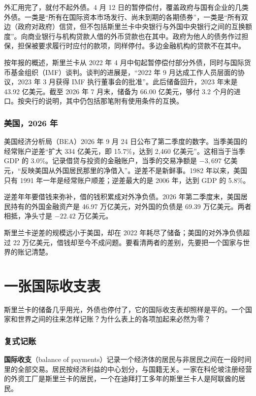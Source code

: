 外汇用完了，就付不起外债。4 月 12 日的暂停偿付，覆盖政府与国有企业的几类外债。一类是“所有在国际资本市场发行、尚未到期的各期债券”，一类是“所有双边（政府对政府）信贷，但不包括斯里兰卡中央银行与外国中央银行之间的互换额度”。向商业银行与机构贷款人借的外币贷款也在其中。政府为他人的债务作过担保，担保被要求履行时应付的款项，同样停付。多边金融机构的贷款不在其中\cite{lktreasury2022}。

按年报的概述，斯里兰卡从 2022 年 4 月中旬起暂停偿付部分外债，同时与国际货币基金组织（IMF）谈判。谈判的进展是，“2022 年 9 月达成工作人员层面的协议，2023 年 3 月获得 IMF 执行董事会的批准”\cite{cbsl2023ar}。此后储备回升，2023 年末是 43.92 亿美元。截至 2026 年 7 月末，储备为 66.00 亿美元，够付 3.2 个月的进口。按央行的说明，其中仍包括那笔附有使用条件的互换\cite{cbsl2026rdt}。

\subsubsection{美国，2026 年}
美国经济分析局（BEA）2026 年 9 月 24 日公布了第二季度的数字。当季美国的经常账户逆差“扩大 334 亿美元，即 15.7\%，达到 2,460 亿美元”。这相当于当季 GDP 的 3.0\%。记录借贷与投资的金融账户，当季的交易净额是 $-3,697$ 亿美元，“反映美国从外国居民那里的净借入”\cite{bea2026q2}。逆差不是新鲜事。1982 年以来，美国只有 1991 年一年是经常账户顺差；逆差最大的是 2006 年，达到 GDP 的 5.8\%\cite{wdi2026}。

逆差年年要借钱来弥补，借的钱积累成对外净负债。2026 年第二季度末，美国居民持有的外国金融资产是 46.97 万亿美元，对外国的负债是 69.39 万亿美元。两者相抵，净头寸是 $-22.42$ 万亿美元\cite{bea2026q2}。

斯里兰卡逆差的规模远小于美国，却在 2022 年耗尽了储备；美国的对外净负债超过 22 万亿美元，借钱却至今不成问题。要看清两者的差别，先要把一个国家与世界的账记清楚。

\section{一张国际收支表}\label{sec:external-bop}

斯里兰卡的储备几乎用光，外债也停付了，它的国际收支表却照样是平的。一个国家和世界之间的往来怎样记账？为什么表上的各项加起来必然为零？

\subsubsection{复式记账}
\textbf{国际收支}（balance of payments）记录一个经济体的居民与非居民之间在一段时间里的全部交易。居民按经济利益的中心划分，与国籍无关。一家在科伦坡注册经营的外资工厂是斯里兰卡的居民，一个在迪拜打工多年的斯里兰卡人是阿联酋的居民。

